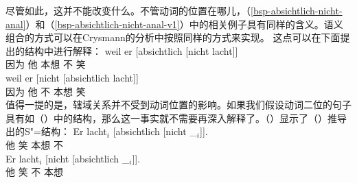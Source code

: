 \begin{enumerate}
{\z
尽管如此，这并不能改变什么。不管动词的位置在哪儿，（\ref{bsp-absichtlich-nicht-anal}）和（\ref{bsp-absichtlich-nicht-anal-v1}）中的相关例子具有同样的含义。语义组合的方式可以在Crysmann的分析中按照同样的方式来实现。
}
这点可以在下面提出的结构中进行解释：
\eal
\label{bsp-absichtlich-nicht-anal}
\ex 
\gll weil er [absichtlich [nicht lacht]]\\
	 因为 他 \spacebr{}本想 \spacebr{}不 笑\\
\ex 
\gll weil er [nicht [absichtlich lacht]]\\
     因为 他 \spacebr{}不 \spacebr{}本想 笑\\
\zl
值得一提的是，辖域关系并不受到动词位置的影响。如果我们假设动词二位的句子具有如（）中的结构，那么这一事实就不需要再深入解释了。（）显示了（）推导出的S"=结构：
\eal
\label{bsp-absichtlich-nicht-anal-v1}
\ex 
\gll Er lacht$_i$ [absichtlich [nicht \_$_i$]].\\
     他 笑 \spacebr{}本想 \spacebr{}不\\
\ex 
\gll Er lacht$_i$  [nicht [absichtlich \_$_i$]].\\
     他 笑 \spacebr{}不 \spacebr{}本想\\
\zl{}
\nocite{Hoehle88a,Hoehle97a}
\end{enumerate}

